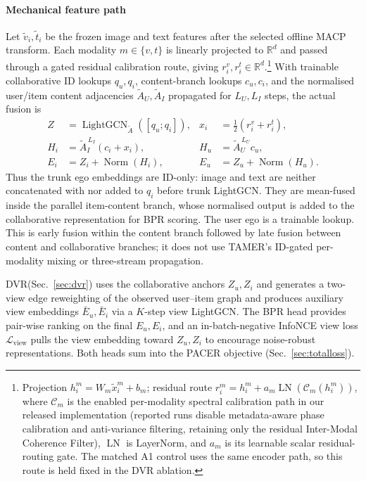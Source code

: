 \documentclass[conference]{IEEEtran}
\newcommand{\Lcal}{\mathcal{L}}
\newcommand{\dvr}{DVR\xspace}
\begin{document}
\paragraph{Mechanical feature path}
Let $\widetilde v_i,\widetilde t_i$ be the frozen image and text
features after the selected offline MACP transform. Each modality
$m\in\{v,t\}$ is linearly projected to $\mathbb R^d$ and passed
through a gated residual calibration route, giving
$r_i^v,r_i^t\in\mathbb R^d$.\footnote{Projection
$h_i^m=W_m\widetilde x_i^m+b_m$; residual route
$r_i^m=h_i^m+a_m\operatorname{LN}(\mathcal C_m(h_i^m))$, where
$\mathcal C_m$ is the enabled per-modality spectral calibration path
in our released implementation (reported runs disable metadata-aware phase
calibration and anti-variance filtering, retaining only the residual
Inter-Modal Coherence Filter), $\operatorname{LN}$ is LayerNorm,
and $a_m$ is its learnable scalar residual-routing
gate. The matched A1
control uses the same encoder path, so this route is held fixed in
the \dvr ablation.} With trainable collaborative ID
lookups $q_u,q_i$, content-branch lookups $c_u,c_i$, and the
normalised user/item content adjacencies $\widetilde A_U,\widetilde
A_I$ propagated for $L_U,L_I$ steps, the actual fusion is
\begin{equation}
\begin{aligned}
 Z&=\operatorname{LightGCN}_{\widetilde A}([q_u;q_i]),&
 x_i&=\tfrac12(r_i^v+r_i^t),\\
 H_i&=\widetilde A_I^{\,L_I}(c_i+x_i),&
 H_u&=\widetilde A_U^{\,L_U}c_u,\\
 E_i&=Z_i+\operatorname{Norm}(H_i),&
 E_u&=Z_u+\operatorname{Norm}(H_u).
\end{aligned}
\label{eq:egofusion}
\end{equation}
Thus the trunk ego embeddings are ID-only: image and text are neither
concatenated with nor added to $q_i$ before trunk LightGCN. They are
mean-fused inside the parallel item-content branch, whose normalised
output is added to the collaborative representation for BPR scoring.
The user ego is a trainable lookup. This is early fusion within the
content branch followed by late fusion between content and
collaborative branches; it does not use TAMER's ID-gated per-modality
mixing or three-stream propagation.

\dvr (Sec.~\ref{sec:dvr}) uses the collaborative anchors $Z_u,Z_i$
and generates a two-view edge
reweighting of the observed user--item graph and produces auxiliary
view embeddings $\bar E_u, \bar E_i$ via a $K$-step view LightGCN. The
BPR head provides pair-wise ranking on the final $E_u,E_i$, and an
in-batch-negative InfoNCE view loss $\Lcal_{\text{view}}$ pulls the
view embedding toward $Z_u,Z_i$ to encourage noise-robust
representations. Both heads sum into the PACER objective
(Sec.~\ref{sec:totalloss}).
\end{document}

